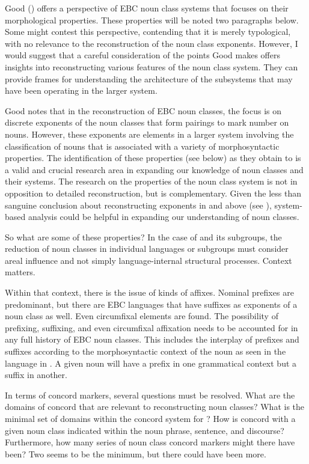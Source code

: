 \documentclass[output=paper]{langsci/langscibook}
\begin{document}
Good () offers a perspective of EBC noun class systems that focuses on their morphological properties. These properties will be noted two paragraphs below.  Some might contest this perspective, contending that it is merely typological, with no relevance to the reconstruction of the  noun class exponents. However, I would suggest that a careful consideration of the points Good makes offers insights into reconstructing various features of the  noun class system. They can provide frames for understanding the architecture of the subsystems that may have been operating in the larger system.

Good notes that in the reconstruction of EBC noun classes, the focus is on discrete exponents of the noun classes that form pairings to mark number on nouns. However, these exponents are elements in a larger system involving the classification of nouns that is associated with a variety of morphosyntactic properties. The identification of these properties (see below) as they obtain to  is a valid and crucial research area in expanding our knowledge of  noun classes and their systems. The research on the properties of the  noun class system is not in opposition to detailed reconstruction, but is complementary. Given the less than sanguine conclusion about reconstructing exponents in  and  above (see ), system-based analysis could be helpful in expanding our understanding of  noun classes.  

So what are some of these properties? In the case of  and its subgroups, the reduction of noun classes in individual languages or subgroups must consider areal influence and not simply language-internal structural processes. Context matters. 

Within that context, there is the issue of kinds of affixes. Nominal prefixes are predominant, but there are EBC languages that have suffixes as exponents of a noun class as well. Even circumfixal elements are found. The possibility of prefixing, suffixing, and even circumfixal affixation needs to be accounted for in any full history of EBC noun classes. This includes the interplay of prefixes and suffixes according to the morphosyntactic context of the noun as seen in the language  in . A given noun will have a prefix in one grammatical context but a suffix in another.

In terms of concord markers, several questions must be resolved. What are the domains of concord that are relevant to reconstructing  noun classes? What is the minimal set of domains within the concord system for ? How is concord with a given noun class indicated within the noun phrase, sentence, and discourse? Furthermore, how many series of noun class concord markers might there have been? Two seems to be the minimum, but there could have been more. 
\end{document}
